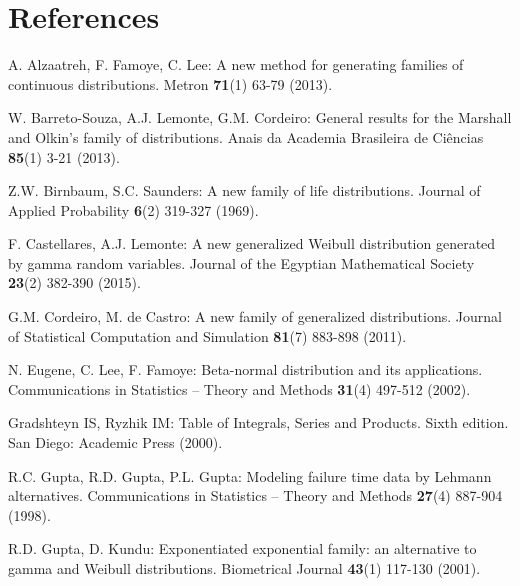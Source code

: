\documentclass[12pt,a4paper]{article} %
\begin{document}
\section*{References}

\begin{description}

\item
A. Alzaatreh, F. Famoye, C. Lee:
A new method for generating families of continuous distributions.
Metron {\bf 71}(1) 63-79 (2013).

\item
W. Barreto-Souza, A.J. Lemonte, G.M. Cordeiro:
General results for the Marshall and Olkin's family of distributions.
Anais da Academia Brasileira de Ci\^{e}ncias {\bf 85}(1) 3-21 (2013).

\item
Z.W. Birnbaum, S.C. Saunders:
A new family of life distributions.
Journal of Applied Probability {\bf 6}(2) 319-327 (1969).

\item
F. Castellares, A.J. Lemonte:
A new generalized Weibull distribution gene\-rated by gamma random variables.
Journal of the Egyptian Mathematical Society {\bf 23}(2) 382-390 (2015).

\item
G.M. Cordeiro, M. de Castro:
A new family of generalized distributions.
Journal of Statistical Computation and Simulation {\bf 81}(7) 883-898 (2011).

\item
N. Eugene, C. Lee, F. Famoye:
Beta-normal distribution and its applications.
Communications in Statistics -- Theory and Methods {\bf 31}(4) 497-512 (2002).

\item

Gradshteyn IS, Ryzhik IM: Table of Integrals, Series and Products. Sixth edition. San Diego: Academic Press (2000).

\item
R.C. Gupta, R.D. Gupta, P.L. Gupta:
Modeling failure time data by Lehmann alternatives.
Communications in Statistics -- Theory and Methods {\bf 27}(4) 887-904 (1998).

\item
R.D. Gupta, D. Kundu:
Exponentiated exponential family: an alternative to gamma and Weibull distributions.
Biometrical Journal {\bf 43}(1) 117-130 (2001).



\end{description}
\end{document}
